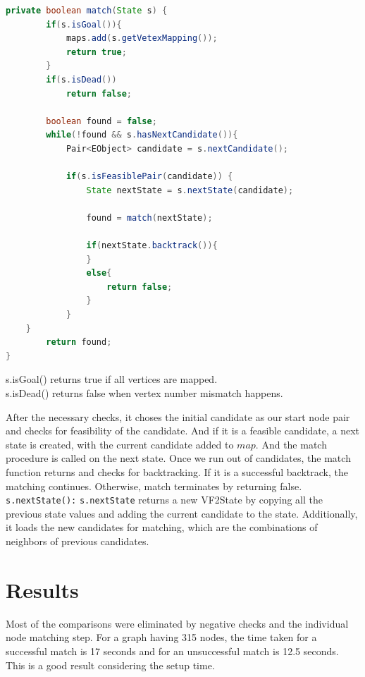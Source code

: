 \begin{lstlisting}[language = Java,frame = single]
private boolean match(State s) {
		if(s.isGoal()){
			maps.add(s.getVetexMapping());
			return true;
		}
		if(s.isDead())
			return false;
		
		boolean found = false;		
		while(!found && s.hasNextCandidate()){
			Pair<EObject> candidate = s.nextCandidate();
					
			if(s.isFeasiblePair(candidate)) {
				State nextState = s.nextState(candidate);
						
				found = match(nextState);
			
				if(nextState.backtrack()){			
				}
				else{
					return false;
				}
			}
	}
		return found;
}
\end{lstlisting}

s.isGoal() returns true if all vertices are mapped.\\
s.isDead() returns false when vertex number mismatch happens. 

After the necessary checks, it choses the initial candidate as our start node pair and checks for feasibility of the candidate. And if it is a feasible candidate, a next state is created, with the current candidate added to $map$.
And the match procedure is called on the next state. Once we run out of candidates, the match function returns and checks for backtracking. If it is a successful backtrack, the matching continues. Otherwise, match terminates by returning false. \\

\texttt{s.nextState():}
\texttt{s.nextState} returns a new VF2State by copying all the previous state values and adding the current candidate to the state. Additionally, it loads the new candidates for matching, which are the combinations of neighbors of previous candidates. 

\section{Results}
Most of the comparisons were eliminated by negative checks and the individual node matching step. For a graph having 315 nodes, the time taken for a successful match is 17 seconds and for an unsuccessful match is 12.5 seconds. This is a good result considering the setup time.

